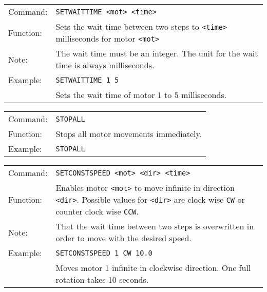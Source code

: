 \vspace{\vdistace}

\begin{table}[h]
  \begin{tabularx}{\textwidth}{lX}
    Command:  & \texttt{SETWAITTIME <mot> <time>}\\
    Function: & Sets the wait time between two steps to \texttt{<time>} milliseconds
                for motor \texttt{<mot>}\\
    Note:     & The wait time must be an integer. The unit for the wait time
                is always milliseconds.\\
    Example:  & \texttt{SETWAITTIME 1 5}\\
              & Sets the wait time of motor 1 to 5 milliseconds.
  \end{tabularx}
\end{table}

\vspace{\vdistace}

\begin{table}[h]
  \begin{tabularx}{\textwidth}{lX}
    Command:  & \texttt{STOPALL}\\
    Function: & Stops all motor movements immediately.\\
    Example:  & \texttt{STOPALL}
  \end{tabularx}
\end{table}

\vspace{\vdistace}

\begin{table}[h]
  \begin{tabularx}{\textwidth}{lX}
    Command:  & \texttt{SETCONSTSPEED <mot> <dir> <time>}\\
    Function: & Enables motor \texttt{<mot>} to move infinite in direction \texttt{<dir>}.
                Possible values for \texttt{<dir>} are clock wise \texttt{CW} or
                counter clock wise \texttt{CCW}. \\
    Note:     & That the wait time between two steps is overwritten in order to move with the desired speed.\\
    Example:  & \texttt{SETCONSTSPEED 1 CW 10.0}\\
              & Moves motor 1 infinite in clockwise direction.
                One full rotation takes 10 seconds.
  \end{tabularx}
\end{table}

